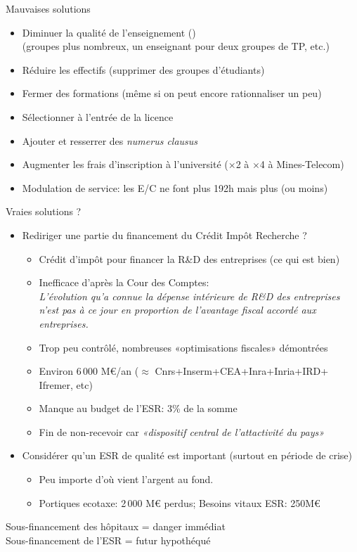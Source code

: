 \documentclass[10pt,final,usepdftitle=false]{beamer}
\begin{document}
\begin{frame}{Mauvaises solutions}
\begin{itemize}
\item Diminuer la qualité de l'enseignement ()\\
  {\small (groupes plus nombreux, un enseignant pour deux groupes de TP, etc.)}
\item Réduire les effectifs (supprimer des groupes d'étudiants)
\item Fermer des formations (même si on peut encore rationnaliser un peu)
\item Sélectionner à l'entrée de la licence
\item Ajouter et resserrer des \textsl{numerus clausus}
\item Augmenter les frais d'inscription à l'université %
  ($\times$2 à $\times$4 à Mines-Telecom)
\item Modulation de service: les E/C ne font plus 192h mais plus (ou moins)
\end{itemize}
\end{frame}

\begin{frame}{Vraies solutions ?}
\begin{itemize}

\item Rediriger une partie du financement du Crédit Impôt Recherche ?
\begin{itemize}
\item Crédit d'impôt pour financer la R\&D des entreprises (ce qui est bien)
\item Inefficace d'après la Cour des Comptes:\\
  {\sl \og L’évolution qu’a connue la dépense intérieure de R\&D des entreprises
    n’est pas à ce jour en proportion de l’avantage fiscal accordé aux
    entreprises. \fg }
\item Trop peu contrôlé, nombreuses «optimisations fiscales» démontrées
\item Environ 6$\,$000 M\euro/an ($\approx$ Cnrs+Inserm+CEA+Inra+Inria+IRD+
  Ifremer, etc)
\item Manque au budget de l'ESR: 3\% de la somme
\item Fin de non-recevoir car \textit{«dispositif central de l'attactivité du
    pays»}
\end{itemize}
\pause \bigskip
\item Considérer qu'un ESR de qualité est important (surtout en période de
  crise)
  \begin{itemize}
  \item Peu importe d'où vient l'argent au fond.
  \item Portiques ecotaxe: 2$\,$000 M\euro{} perdus; Besoins vitaux ESR:
    250M\euro
  \end{itemize}
\end{itemize}
\begin{center}
  Sous-financement des hôpitaux = danger immédiat\\
  Sous-financement de l'ESR = futur hypothéqué
\end{center}
\end{frame}
\end{document}
